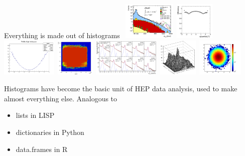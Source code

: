 \documentclass[aspectratio=169]{beamer}
\begin{document}
\begin{frame}{Everything is made out of histograms}
\vspace{0.5 cm}
\mbox{\hspace{-1.1 cm}
\includegraphics[height=1.8cm]{dileptons_fig_01b_mumu.png}
\includegraphics[height=1.8cm]{efficiency.png}
\includegraphics[height=1.8cm]{profile_plot.png}
\includegraphics[height=1.8cm]{efficiency_2d.png}
\includegraphics[height=1.8cm]{histograms_of_histograms.png}
\includegraphics[height=1.8cm]{lego_plot.png}
\includegraphics[height=1.8cm]{two_dimensional.png}}

\vspace{0.5 cm}
\begin{center}
\begin{minipage}{0.9\linewidth}
\Large Histograms have become the basic unit of HEP data analysis, used to make almost everything else. Analogous to

\vspace{0.5 cm}
\hspace{0.5 cm}\begin{minipage}{0.5\linewidth}
\begin{itemize}
\item lists in LISP
\item dictionaries in Python
\item data.frames in R
\end{itemize}
\end{minipage}
\end{minipage}
\end{center}
\end{frame}
\end{document}
